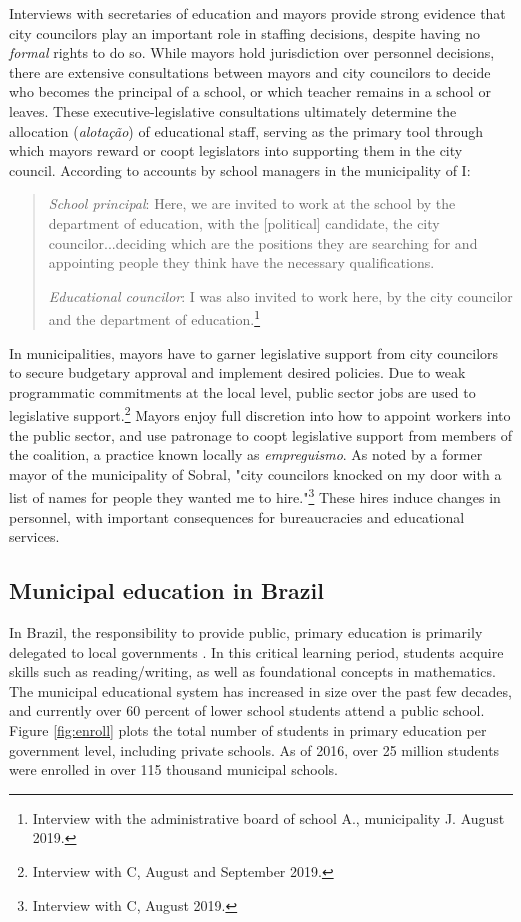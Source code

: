 \documentclass[12pt,a4paper]{article}
\begin{document}
Interviews with secretaries of education and mayors provide strong evidence that city councilors play an important role in staffing decisions, despite having no \emph{formal} rights to do so. While mayors hold jurisdiction over personnel decisions, there are extensive consultations between mayors and city councilors to decide who becomes the principal of a school, or which teacher remains in a school or leaves. These executive-legislative consultations ultimately determine the allocation (\textit{alotação}) of educational staff, serving as the primary tool through which mayors reward or coopt legislators into supporting them in the city council. According to accounts by school managers in the municipality of I:

\begin{quote}
    \emph{School principal}: Here, we are invited to work at the school by the department of education, with the [political] candidate, the city councilor...deciding which are the positions they are searching for and appointing people they think have the necessary qualifications.

    \emph{Educational councilor}: I was also invited to work here, by the city councilor and the department of education.\footnote{Interview with the administrative board of school A., municipality J. August 2019.}
\end{quote}

In municipalities, mayors have to garner legislative support from city councilors to secure budgetary approval and implement desired policies. Due to weak programmatic commitments at the local level, public sector jobs are used to legislative support.\footnote{Interview with C, August and September 2019.} Mayors enjoy full discretion into how to appoint workers into the public sector, and use patronage to coopt legislative support from members of the coalition, a practice known locally as \textit{empreguismo}. As noted by a former mayor of the municipality of Sobral, "city councilors knocked on my door with a list of names for people they wanted me to hire."\footnote{Interview with C, August 2019.} These hires induce changes in personnel, with important consequences for bureaucracies and educational services.

\subsection{Municipal education in Brazil}

In Brazil, the responsibility to provide public, primary education is primarily delegated to local governments \citet{paschoal_historia_2009}. In this critical learning period, students acquire skills such as reading/writing, as well as foundational concepts in mathematics. The municipal educational system has increased in size over the past few decades, and currently over 60 percent of lower school students attend a public school. Figure \ref{fig:enroll} plots the total number of students in primary education per government level, including private schools. As of 2016, over 25 million students were enrolled in over 115 thousand municipal schools.
\end{document}
